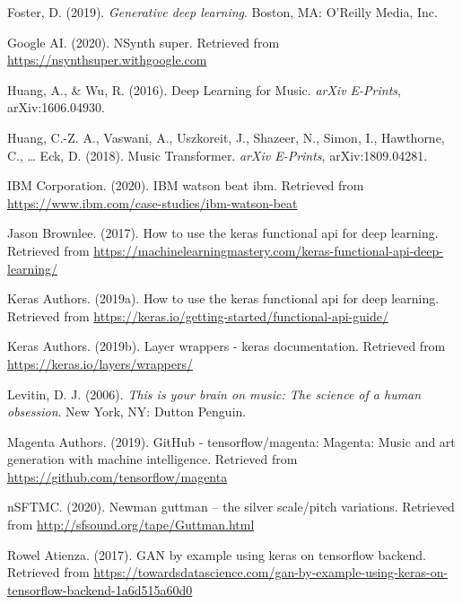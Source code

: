 \documentclass[12pt,oneside]{chicagocapstone}
\begin{document}
\leavevmode\hypertarget{ref-foster2019}{}%
Foster, D. (2019). \emph{Generative deep learning}. Boston, MA: O'Reilly Media, Inc.

\leavevmode\hypertarget{ref-nsynth}{}%
Google AI. (2020). NSynth super. Retrieved from \url{https://nsynthsuper.withgoogle.com}

\leavevmode\hypertarget{ref-2016arXiv160604930H}{}%
Huang, A., \& Wu, R. (2016). Deep Learning for Music. \emph{arXiv E-Prints}, arXiv:1606.04930.

\leavevmode\hypertarget{ref-2018arXiv180904281H}{}%
Huang, C.-Z. A., Vaswani, A., Uszkoreit, J., Shazeer, N., Simon, I., Hawthorne, C., \ldots{} Eck, D. (2018). Music Transformer. \emph{arXiv E-Prints}, arXiv:1809.04281.

\leavevmode\hypertarget{ref-watson}{}%
IBM Corporation. (2020). IBM watson beat \textbar{} ibm. Retrieved from \url{https://www.ibm.com/case-studies/ibm-watson-beat}

\leavevmode\hypertarget{ref-keras_func_api_tutorial}{}%
Jason Brownlee. (2017). How to use the keras functional api for deep learning. Retrieved from \url{https://machinelearningmastery.com/keras-functional-api-deep-learning/}

\leavevmode\hypertarget{ref-keras_func_api}{}%
Keras Authors. (2019a). How to use the keras functional api for deep learning. Retrieved from \url{https://keras.io/getting-started/functional-api-guide/}

\leavevmode\hypertarget{ref-keras_wrappers}{}%
Keras Authors. (2019b). Layer wrappers - keras documentation. Retrieved from \url{https://keras.io/layers/wrappers/}

\leavevmode\hypertarget{ref-levitin2006}{}%
Levitin, D. J. (2006). \emph{This is your brain on music: The science of a human obsession}. New York, NY: Dutton Penguin.

\leavevmode\hypertarget{ref-magenta}{}%
Magenta Authors. (2019). GitHub - tensorflow/magenta: Magenta: Music and art generation with machine intelligence. Retrieved from \url{https://github.com/tensorflow/magenta}

\leavevmode\hypertarget{ref-silver_scale}{}%
nSFTMC. (2020). Newman guttman -- the silver scale/pitch variations. Retrieved from \url{http://sfsound.org/tape/Guttman.html}

\leavevmode\hypertarget{ref-gan_example}{}%
Rowel Atienza. (2017). GAN by example using keras on tensorflow backend. Retrieved from \url{https://towardsdatascience.com/gan-by-example-using-keras-on-tensorflow-backend-1a6d515a60d0}
\end{document}
